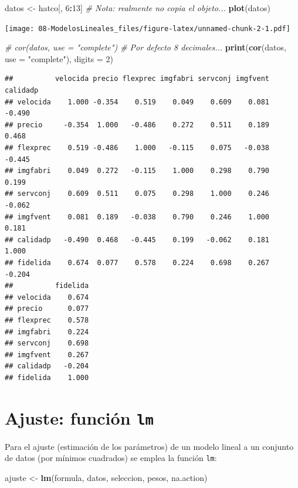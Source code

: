\documentclass[]{book}
\newenvironment{Shaded}{\begin{snugshade}}{\end{snugshade}}
\newcommand{\KeywordTok}[1]{\textcolor[rgb]{0.13,0.29,0.53}{\textbf{#1}}}
\newcommand{\DataTypeTok}[1]{\textcolor[rgb]{0.13,0.29,0.53}{#1}}
\newcommand{\DecValTok}[1]{\textcolor[rgb]{0.00,0.00,0.81}{#1}}
\newcommand{\StringTok}[1]{\textcolor[rgb]{0.31,0.60,0.02}{#1}}
\newcommand{\CommentTok}[1]{\textcolor[rgb]{0.56,0.35,0.01}{\textit{#1}}}
\newcommand{\OperatorTok}[1]{\textcolor[rgb]{0.81,0.36,0.00}{\textbf{#1}}}
\newcommand{\NormalTok}[1]{#1}
\begin{document}
\begin{Shaded}
\begin{Highlighting}[]
\NormalTok{datos <-}\StringTok{ }\NormalTok{hatco[, }\DecValTok{6}\OperatorTok{:}\DecValTok{13}\NormalTok{]  }\CommentTok{# Nota: realmente no copia el objeto...}
\KeywordTok{plot}\NormalTok{(datos)}
\end{Highlighting}
\end{Shaded}

\texttt{[image: 08-ModelosLineales\_files/figure-latex/unnamed-chunk-2-1.pdf]}

\begin{Shaded}
\begin{Highlighting}[]
\CommentTok{# cor(datos, use = "complete") # Por defecto 8 decimales...}
\KeywordTok{print}\NormalTok{(}\KeywordTok{cor}\NormalTok{(datos, }\DataTypeTok{use =} \StringTok{"complete"}\NormalTok{), }\DataTypeTok{digits =} \DecValTok{2}\NormalTok{)}
\end{Highlighting}
\end{Shaded}

\begin{verbatim}
##          velocida precio flexprec imgfabri servconj imgfvent calidadp
## velocida    1.000 -0.354    0.519    0.049    0.609    0.081   -0.490
## precio     -0.354  1.000   -0.486    0.272    0.511    0.189    0.468
## flexprec    0.519 -0.486    1.000   -0.115    0.075   -0.038   -0.445
## imgfabri    0.049  0.272   -0.115    1.000    0.298    0.790    0.199
## servconj    0.609  0.511    0.075    0.298    1.000    0.246   -0.062
## imgfvent    0.081  0.189   -0.038    0.790    0.246    1.000    0.181
## calidadp   -0.490  0.468   -0.445    0.199   -0.062    0.181    1.000
## fidelida    0.674  0.077    0.578    0.224    0.698    0.267   -0.204
##          fidelida
## velocida    0.674
## precio      0.077
## flexprec    0.578
## imgfabri    0.224
## servconj    0.698
## imgfvent    0.267
## calidadp   -0.204
## fidelida    1.000
\end{verbatim}

\section{\texorpdfstring{Ajuste: función
\texttt{lm}}{Ajuste: función lm}}\label{ajuste-funcion-lm}

Para el ajuste (estimación de los parámetros) de un modelo lineal a un
conjunto de datos (por mínimos cuadrados) se emplea la función
\texttt{lm}:

\begin{Shaded}
\begin{Highlighting}[]
\NormalTok{ajuste <-}\StringTok{ }\KeywordTok{lm}\NormalTok{(formula, datos, seleccion, pesos, na.action)}
\end{Highlighting}
\end{Shaded}
\end{document}

